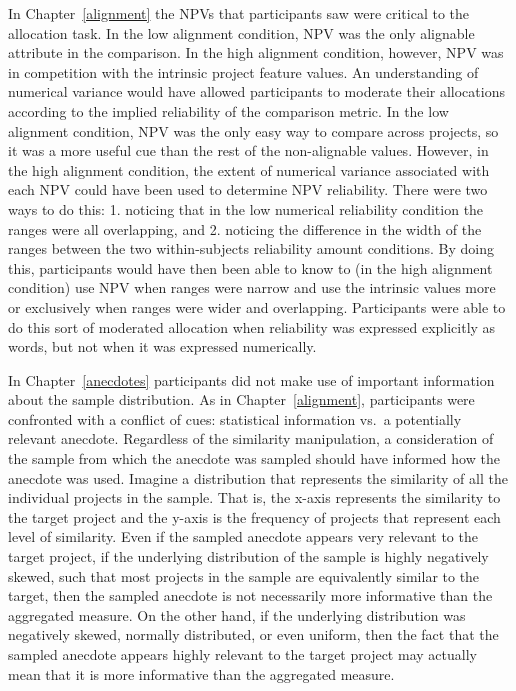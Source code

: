 \documentclass[a4paper, nobind, dvipsnames]{templates/ociamthesis}
\theoremstyle{definition}
\theoremstyle{definition}
\theoremstyle{definition}
\theoremstyle{definition}
\theoremstyle{remark}
\begin{document}
In Chapter~\ref{alignment} the NPVs that participants saw were critical to the
allocation task. In the low alignment condition, NPV was the only alignable
attribute in the comparison. In the high alignment condition, however, NPV was
in competition with the intrinsic project feature values. An understanding of
numerical variance would have allowed participants to moderate their allocations
according to the implied reliability of the comparison metric. In the low
alignment condition, NPV was the only easy way to compare across projects, so it
was a more useful cue than the rest of the non-alignable values. However, in the
high alignment condition, the extent of numerical variance associated with each
NPV could have been used to determine NPV reliability. There were two ways to do
this: 1. noticing that in the low numerical reliability condition the ranges
were all overlapping, and 2. noticing the difference in the width of the ranges
between the two within-subjects reliability amount conditions. By doing this,
participants would have then been able to know to (in the high alignment
condition) use NPV when ranges were narrow and use the intrinsic values more or
exclusively when ranges were wider and overlapping. Participants were able to do
this sort of moderated allocation when reliability was expressed explicitly as
words, but not when it was expressed numerically.

In Chapter~\ref{anecdotes} participants did not make use of important
information about the sample distribution. As in Chapter~\ref{alignment},
participants were confronted with a conflict of cues: statistical information
vs.~a potentially relevant anecdote. Regardless of the similarity manipulation,
a consideration of the sample from which the anecdote was sampled should have
informed how the anecdote was used. Imagine a distribution that represents the
similarity of all the individual projects in the sample. That is, the x-axis
represents the similarity to the target project and the y-axis is the frequency
of projects that represent each level of similarity. Even if the sampled
anecdote appears very relevant to the target project, if the underlying
distribution of the sample is highly negatively skewed, such that most projects
in the sample are equivalently similar to the target, then the sampled anecdote
is not necessarily more informative than the aggregated measure. On the other
hand, if the underlying distribution was negatively skewed, normally
distributed, or even uniform, then the fact that the sampled anecdote appears
highly relevant to the target project may actually mean that it is more
informative than the aggregated measure.
\end{document}
